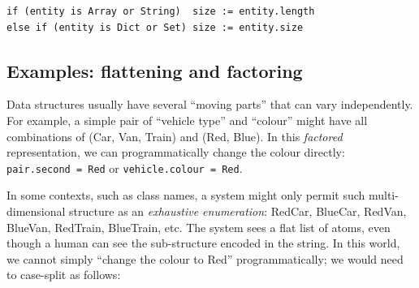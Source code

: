 \documentclass[ twoside,openright,titlepage,numbers=noenddot,headinclude,footinclude,cleardoublepage=empty,abstract=on,
                BCOR=5mm,paper=a4,fontsize=11pt
                ]{scrreprt}
\newcommand{\joel}[1]{}
\newcommand{\note}[1]{}
\theoremstyle{definition}
\begin{document}
\begin{verbatim}
if (entity is Array or String)  size := entity.length
else if (entity is Dict or Set) size := entity.size
\end{verbatim}

\joel{Web APIs e.g. onmousedown/onmouseup, imperative onmousemove instead of reified mouse pointer observable (this belongs more in a Factoring of Structure / Complexity dimension...)
   - tbh this is also a "machine legibility" issue; a human can recognise onmousemove and onmousedown as having something in common -- "mouse" -- but the computer just sees two non-equal strings as different as zQx6= and omlette.
   - onmousedown further makes the *mouse* part explicit, but the sub-device -- the button -- is passed as a numerical argument. ...
   - What really annoyed me, and seems most relevant, is that mouse buttons and keyboard keys the same in a very significant way -- they're binary-state buttons -- which means they ought to "implement the same interface", so the system will let me treat them the same insofar as they have commonalities like this. It should be trivial to rebind keyboard keys to the mouse buttons or vice versa, but this "poor factoring" obstructs this.
   - viz. OOP interfaces and abstraction, this factoring is forcing you to rely on irrelevant concrete details of the object. Instead of `if (isMouseButton) listenMouseButton(fn) else if (isKey) listenKey(fn)`, it should just be `listen(fn)`.}

\note{
EXAMPLES: interfaces/base classes; structural vs nominal typing
EXAMPLES: non-programming language world?
HyperCard - had shared backgrounds, which arose from the need of writing the help files.
}

\hypertarget{examples-flattening-and-factoring}{\subsection{Examples: flattening and
factoring}\label{examples-flattening-and-factoring}}

Data structures usually have several ``moving parts'' that can vary
independently. For example, a simple pair of ``vehicle type'' and
``colour'' might have all combinations of (Car, Van, Train) and (Red,
Blue). In this \emph{factored} representation, we can programmatically
change the colour directly: \texttt{pair.second\ =\ Red} or
\texttt{vehicle.colour\ =\ Red}.

In some contexts, such as class names, a system might only permit such
multi-dimensional structure as an \emph{exhaustive enumeration}: RedCar,
BlueCar, RedVan, BlueVan, RedTrain, BlueTrain, etc. The system sees a
flat list of atoms, even though a human can see the sub-structure
encoded in the string. In this world, we cannot simply ``change the
colour to Red'' programmatically; we would need to case-split as
follows:
\end{document}
